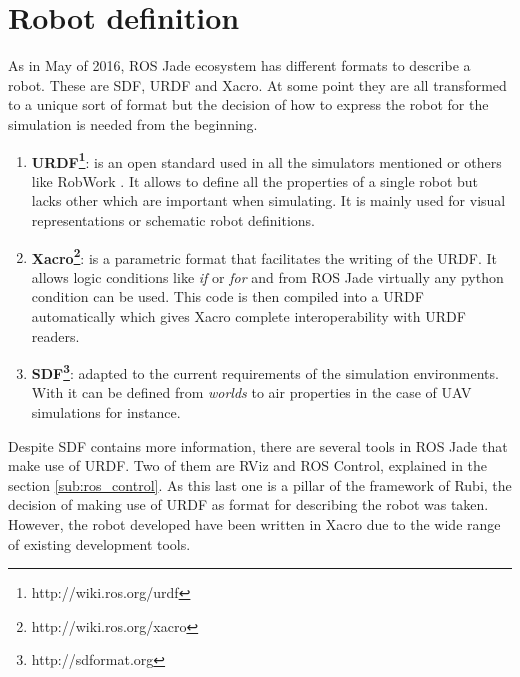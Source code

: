 \section{Robot definition} %
\label{sec:robot_definition}
As in May of 2016, ROS Jade ecosystem has different formats to describe a robot.
These are SDF, URDF and Xacro.
At some point they are all transformed to a unique sort of format but the decision of how to express the robot for the simulation is needed from the beginning.


\begin{enumerate}
  \item \textbf{URDF\footnote{http://wiki.ros.org/urdf}}: is an open standard used in all the simulators mentioned or others like RobWork \cite{robwork}. 
  It allows to define all the properties of a single robot but lacks other which are important when simulating. 
  It is mainly used for visual representations or schematic robot definitions.
  \item \textbf{Xacro\footnote{http://wiki.ros.org/xacro}}: is a parametric format that facilitates the writing of the URDF.
  It allows logic conditions like \textit{if} or \textit{for} and from ROS Jade  virtually any python condition can be used.
  This code is then compiled into a URDF automatically which gives Xacro complete interoperability with URDF readers.
  \item \textbf{SDF\footnote{http://sdformat.org}}: adapted to the current requirements of the simulation environments.
  With it can be defined from \textit{worlds} to air properties in the case of UAV simulations for instance.
\end{enumerate}

Despite SDF contains more information, there are several tools in ROS Jade that make use of URDF.
Two of them are RViz and ROS Control, explained in the section \ref{sub:ros_control}.
As this last one is a pillar of the framework of Rubi, the decision of making use of URDF as format for describing the robot was taken.
However, the robot developed have been written in Xacro due to the wide range of existing development tools.
